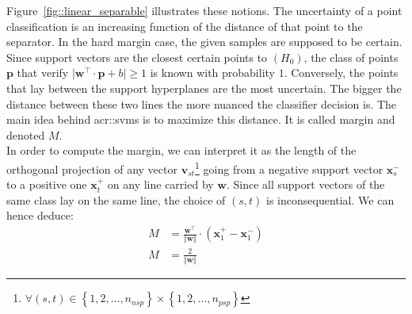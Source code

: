                 Figure~\ref{fig::linear_separable} illustrates these notions.
                The uncertainty of a point classification is an increasing function of the distance of that point to the separator.
                In the hard margin case, the given samples are supposed to be certain.
                Since support vectors are the closest certain points to $(H_0)$, the class of points $\bm{p}$ that verify $\vert\bm{w}^\intercal\cdot\bm{p} + b\vert \geq 1$ is known with probability $1$.
                Conversely, the points that lay between the support hyperplanes are the most uncertain.
                The bigger the distance between these two lines the more nuanced the classifier decision is.
                The main idea behind \glspl{acr::svm} is to maximize this distance.
                It is called margin and denoted $M$.\\

                In order to compute the margin, we can interpret it as the length of the orthogonal projection of any vector $\bm{v}_{st}$\footnote{$\forall (s, t) \in \left\{1,2,\dots,n_{nsp}\right\} \times \left\{1,2,\dots,n_{psp}\right\}$} going from a negative support vector $\bm{x}^-_s$ to a positive one $\bm{x}^+_t$ on any line carried by $\bm{w}$.
                Since all support vectors of the same class lay on the same line, the choice of $(s,t)$ is inconsequential.
                We can hence deduce:
                \begin{align}
                    M &= \frac{\bm{w}^\intercal}{\Vert\bm{w}\Vert} \cdot (\bm{x}^+_1 - \bm{x}^-_1) \nonumber \\
                    M &= \frac{2}{\Vert\bm{w}\Vert}
                \end{align}

